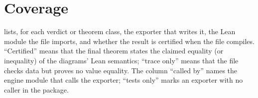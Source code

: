 {{{\section{Coverage}\label{sec:lean-export-coverage}

 lists, for each verdict or theorem class, the exporter that
writes it, the Lean module the file imports, and whether the result is certified when the file
compiles. \enquote{Certified} means that the final theorem states the claimed equality (or
inequality) of the diagrams' Lean semantics; \enquote{trace only} means that the file checks
data but proves no value equality. The column \enquote{called by} names the engine module that
calls the exporter; \enquote{tests only} marks an exporter with no caller in the
 package.

}}}
